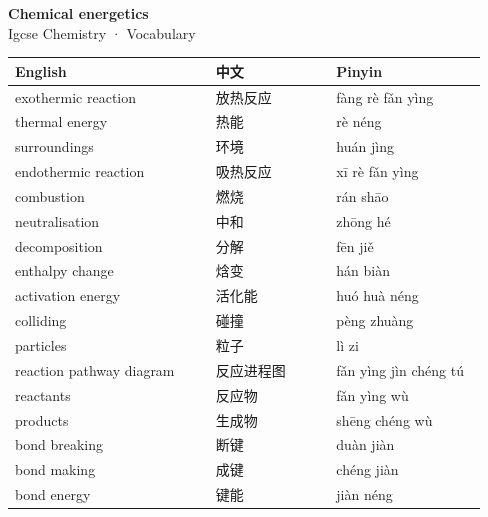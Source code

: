 \documentclass[11pt]{article}
\begin{document}
\begin{center}
  {\LARGE\bfseries Chemical energetics}\\[0.35em]
  {\large Igcse Chemistry · Vocabulary}
\end{center}
\vspace{0.6em}

\begin{longtable}{@{}p{0.40\linewidth}p{0.24\linewidth}p{0.30\linewidth}@{}}
\toprule
\textbf{English} & \textbf{中文} & \textbf{Pinyin} \\
\midrule
\endhead
\bottomrule
\endlastfoot
exothermic reaction & 放热反应 & fàng rè fǎn yìng \\
thermal energy & 热能 & rè néng \\
surroundings & 环境 & huán jìng \\
endothermic reaction & 吸热反应 & xī rè fǎn yìng \\
combustion & 燃烧 & rán shāo \\
neutralisation & 中和 & zhōng hé \\
decomposition & 分解 & fēn jiě \\
enthalpy change & 焓变 & hán biàn \\
activation energy & 活化能 & huó huà néng \\
colliding & 碰撞 & pèng zhuàng \\
particles & 粒子 & lì zi \\
reaction pathway diagram & 反应进程图 & fǎn yìng jìn chéng tú \\
reactants & 反应物 & fǎn yìng wù \\
products & 生成物 & shēng chéng wù \\
bond breaking & 断键 & duàn jiàn \\
bond making & 成键 & chéng jiàn \\
bond energy & 键能 & jiàn néng \\
\end{longtable}
\end{document}
